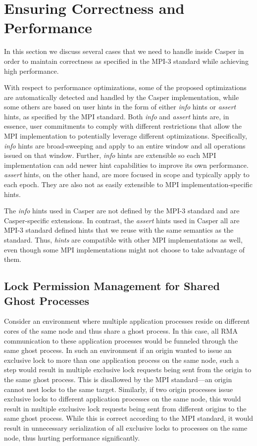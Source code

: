 \section{Ensuring Correctness and Performance}
\label{sec:correctness}

In this section we discuss several cases that we need to handle
inside Casper in order to maintain correctness as specified in the MPI-3
standard while achieving high performance.

With respect to performance optimizations, some of the proposed
optimizations are automatically detected and handled by the Casper
implementation, while some others are based on user hints in the form
of either \emph{info} hints or \emph{assert} hints, as specified by
the MPI standard.  Both \emph{info} and \emph{assert} hints are, in
essence, user commitments to comply with different restrictions that
allow the MPI implementation to potentially leverage different
optimizations. Specifically, \emph{info} hints are broad-sweeping and
apply to an entire window and all operations issued on that window.
Further, \emph{info} hints are extensible so each MPI implementation
can add newer hint capabilities to improve its own performance.
\emph{assert} hints, on the other hand, are more focused in scope and
typically apply to each epoch.  They are also not as easily extensible
to MPI implementation-specific hints.

The \emph{info} hints used in Casper are not
defined by the MPI-3 standard and are Casper-specific extensions.
In contrast, the \emph{assert} hints used in Casper all are MPI-3 standard defined
hints that we reuse with the same semantics as the standard.  Thus,
\emph{hints} are compatible with other MPI implementations as well,
even though some MPI implementations might not choose to take
advantage of them.

\subsection{Lock Permission Management for Shared Ghost Processes}
\label{sec:shared-ghosts}

Consider an environment where multiple application processes reside on
different cores of the same node and thus share a ghost process.  In
this case, all RMA communication to these application processes would
be funneled through the same ghost process.  In such an environment if
an origin wanted to issue an exclusive lock to more than one
application process on the same node, such a step would result in multiple
exclusive lock requests being sent from the origin to the same ghost
process.  This is disallowed by the MPI standard---an origin cannot
nest locks to the same target.  Similarly, if two origin processes
issue exclusive locks to different application processes on the same
node, this would result in multiple exclusive lock requests being sent
from different origins to the same ghost process.  While this is
correct according to the MPI standard, it would result in unnecessary serialization of all exclusive
locks to processes on the same node, thus hurting performance
significantly.

